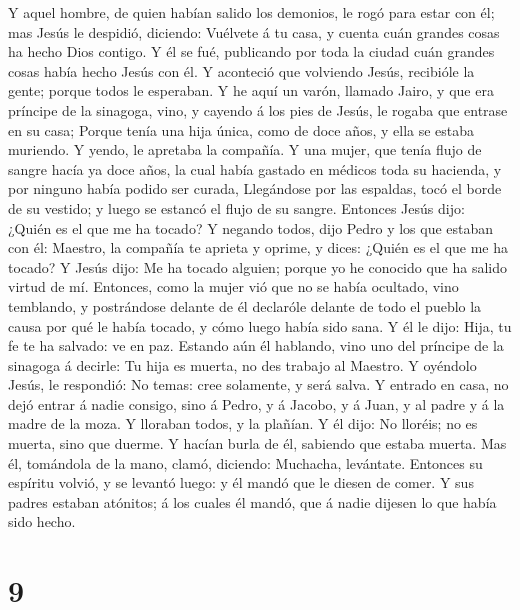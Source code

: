  Y aquel hombre, de quien habían salido los demonios, le
rogó para estar con él; mas Jesús le despidió, diciendo: 
Vuélvete á tu casa, y cuenta cuán grandes cosas ha hecho Dios contigo. Y
él se fué, publicando por toda la ciudad cuán grandes cosas había hecho
Jesús con él.  Y aconteció que volviendo Jesús, recibióle
la gente; porque todos le esperaban.  Y he aquí un varón,
llamado Jairo, y que era príncipe de la sinagoga, vino, y cayendo á los
pies de Jesús, le rogaba que entrase en su casa;  Porque
tenía una hija única, como de doce años, y ella se estaba muriendo. Y
yendo, le apretaba la compañía.  Y una mujer, que tenía
flujo de sangre hacía ya doce años, la cual había gastado en médicos
toda su hacienda, y por ninguno había podido ser curada, 
Llegándose por las espaldas, tocó el borde de su vestido; y luego se
estancó el flujo de su sangre.  Entonces Jesús dijo:
¿Quién es el que me ha tocado? Y negando todos, dijo Pedro y los que
estaban con él: Maestro, la compañía te aprieta y oprime, y dices:
¿Quién es el que me ha tocado?  Y Jesús dijo: Me ha
tocado alguien; porque yo he conocido que ha salido virtud de mí.
 Entonces, como la mujer vió que no se había ocultado,
vino temblando, y postrándose delante de él declaróle delante de todo el
pueblo la causa por qué le había tocado, y cómo luego había sido sana.
 Y él le dijo: Hija, tu fe te ha salvado: ve en paz.
 Estando aún él hablando, vino uno del príncipe de la
sinagoga á decirle: Tu hija es muerta, no des trabajo al Maestro.
 Y oyéndolo Jesús, le respondió: No temas: cree
solamente, y será salva.  Y entrado en casa, no dejó
entrar á nadie consigo, sino á Pedro, y á Jacobo, y á Juan, y al padre y
á la madre de la moza.  Y lloraban todos, y la plañían. Y
él dijo: No lloréis; no es muerta, sino que duerme.  Y
hacían burla de él, sabiendo que estaba muerta.  Mas él,
tomándola de la mano, clamó, diciendo: Muchacha, levántate.
 Entonces su espíritu volvió, y se levantó luego: y él
mandó que le diesen de comer.  Y sus padres estaban
atónitos; á los cuales él mandó, que á nadie dijesen lo que había sido
hecho.

\hypertarget{section-8}{%
\section{9}\label{section-8}}

